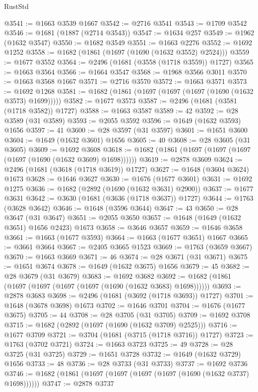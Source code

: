 \begin{lexlean}{RustStd}
\begin{coremodule}
@3541 := @1663 @3539 @1667
@3542 := @2716 @3541
@3543 := @1709 @3542
@3546 := @1681 (@1887 (@2714 @3543))
@3547 := @1634 @257
@3549 := @1962 (@1632 @3547)
@3550 := @1682 @3549
@3551 := @1663 @2276
@3552 := @1692 @1252
@3558 := @1682 (@1861 (@1697 (@1690 (@1632 @3552) @2524)))
@3559 := @1677 @3552
@3564 := @2496 (@1681 (@3558 (@1718 @3559)) @1727)
@3565 := @1663 @3564
@3566 := @1664 @3547
@3568 := @1968 @3566 @3011
@3570 := @1663 @3568 @1667
@3571 := @2716 @3570
@3572 := @1663 @3571
@3573 := @1692 @1268
@3581 := @1682 (@1861 (@1697 (@1697 (@1697 (@1690 (@1632 @3573) @1699)))))
@3582 := @1677 @3573
@3587 := @2496 (@1681 (@3581 (@1718 @3582)) @1727)
@3588 := @1663 @3587
@3589 := 42
@3592 := @28 @3589 (@31 @3589)
@3593 := @2055 @3592
@3596 := @1649 (@1632 @3593) @1656
@3597 := 41
@3600 := @28 @3597 (@31 @3597)
@3601 := @1651 @3600
@3604 := @1649 (@1632 @3601) @1656
@3605 := 40
@3608 := @28 @3605 (@31 @3605)
@3609 := @1692 @3608
@3618 := @1682 (@1861 (@1697 (@1697 (@1697 (@1697 (@1690 (@1632 @3609) @1698))))))
@3619 := @2878 @3609
@3624 := @2496 (@1681 (@3618 (@1718 @3619)) @1727)
@3627 := @1648 (@3604 @3624) @1673
@3628 := @1646 @3627
@3630 := @1676 (@1677 @3601)
@3631 := @1692 @1275
@3636 := @1682 (@2892 (@1690 (@1632 @3631) @2900))
@3637 := @1677 @3631
@3642 := @3630 (@1681 (@3636 (@1718 @3637)) @1727)
@3644 := @1763 (@3628 @3642)
@3646 := @1648 (@3596 @3644)
@3647 := 43
@3650 := @28 @3647 (@31 @3647)
@3651 := @2055 @3650
@3657 := @1648 (@1649 (@1632 @3651) @1656 @2423) @1673
@3658 := @3646 @3657
@3659 := @1646 @3658
@3661 := @1663 (@1677 @3593)
@3664 := @1663 (@1677 @3651) @1667
@3665 := @3661 @3664
@3667 := @2405 @3665 @1523
@3669 := @1763 (@3659 @3667)
@3670 := @1663 @3669
@3671 := 46
@3674 := @28 @3671 (@31 @3671)
@3675 := @1651 @3674
@3678 := @1649 (@1632 @3675) @1656
@3679 := 45
@3682 := @28 @3679 (@31 @3679)
@3683 := @1692 @3682
@3692 := @1682 (@1861 (@1697 (@1697 (@1697 (@1697 (@1690 (@1632 @3683) @1698))))))
@3693 := @2878 @3683
@3698 := @2496 (@1681 (@3692 (@1718 @3693)) @1727)
@3701 := @1648 (@3678 @3698) @1673
@3702 := @1646 @3701
@3704 := @1676 (@1677 @3675)
@3705 := 44
@3708 := @28 @3705 (@31 @3705)
@3709 := @1692 @3708
@3715 := @1682 (@2892 (@1697 (@1690 (@1632 @3709) @2525)))
@3716 := @1677 @3709
@3721 := @3704 (@1681 (@3715 (@1718 @3716)) @1727)
@3723 := @1763 (@3702 @3721)
@3724 := @1663 @3723
@3725 := 49
@3728 := @28 @3725 (@31 @3725)
@3729 := @1651 @3728
@3732 := @1649 (@1632 @3729) @1656
@3733 := 48
@3736 := @28 @3733 (@31 @3733)
@3737 := @1692 @3736
@3746 := @1682 (@1861 (@1697 (@1697 (@1697 (@1697 (@1690 (@1632 @3737) @1698))))))
@3747 := @2878 @3737

\end{coremodule}
\end{lexlean}
